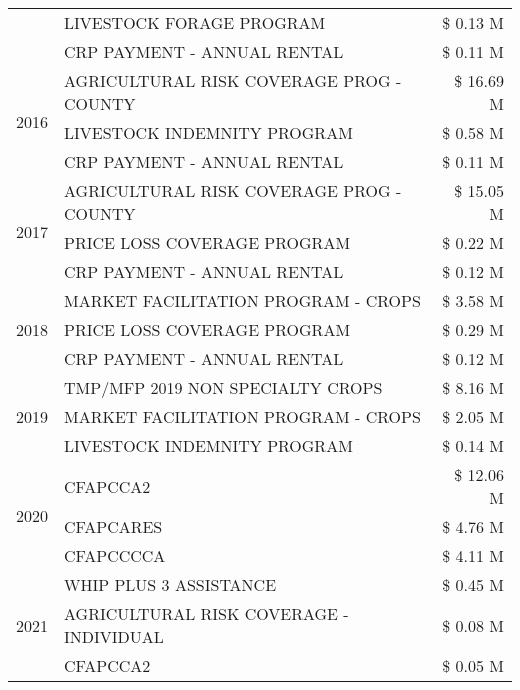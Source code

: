 \begin{tabular}{llr}
 & LIVESTOCK FORAGE PROGRAM & \$ 0.13 M \\
 & CRP PAYMENT - ANNUAL RENTAL & \$ 0.11 M \\
\cline{1-3}
\multirow[t]{3}{*}{2016} & AGRICULTURAL RISK COVERAGE PROG - COUNTY & \$ 16.69 M \\
 & LIVESTOCK INDEMNITY PROGRAM & \$ 0.58 M \\
 & CRP PAYMENT - ANNUAL RENTAL & \$ 0.11 M \\
\cline{1-3}
\multirow[t]{3}{*}{2017} & AGRICULTURAL RISK COVERAGE PROG - COUNTY & \$ 15.05 M \\
 & PRICE LOSS COVERAGE PROGRAM & \$ 0.22 M \\
 & CRP PAYMENT - ANNUAL RENTAL & \$ 0.12 M \\
\cline{1-3}
\multirow[t]{3}{*}{2018} & MARKET FACILITATION PROGRAM - CROPS & \$ 3.58 M \\
 & PRICE LOSS COVERAGE PROGRAM & \$ 0.29 M \\
 & CRP PAYMENT - ANNUAL RENTAL & \$ 0.12 M \\
\cline{1-3}
\multirow[t]{3}{*}{2019} & TMP/MFP 2019 NON SPECIALTY CROPS & \$ 8.16 M \\
 & MARKET FACILITATION PROGRAM - CROPS & \$ 2.05 M \\
 & LIVESTOCK INDEMNITY PROGRAM & \$ 0.14 M \\
\cline{1-3}
\multirow[t]{3}{*}{2020} & CFAPCCA2 & \$ 12.06 M \\
 & CFAPCARES & \$ 4.76 M \\
 & CFAPCCCCA & \$ 4.11 M \\
\cline{1-3}
\multirow[t]{3}{*}{2021} & WHIP PLUS 3 ASSISTANCE & \$ 0.45 M \\
 & AGRICULTURAL RISK COVERAGE - INDIVIDUAL & \$ 0.08 M \\
 & CFAPCCA2 & \$ 0.05 M \\
\cline{1-3}
\bottomrule
\end{tabular}
